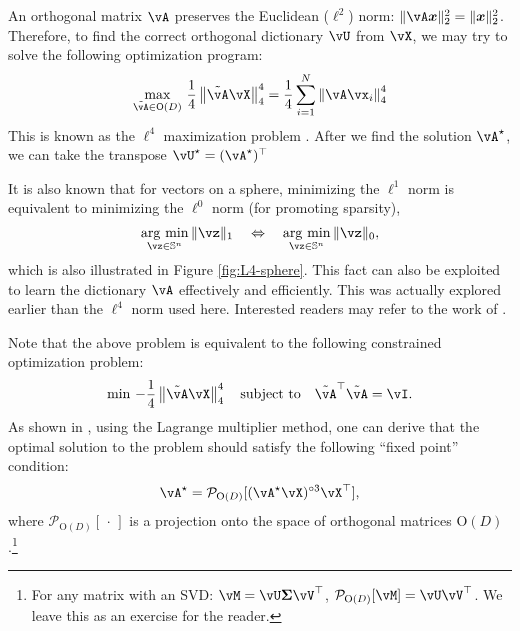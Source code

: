 \documentclass[../../book-main.tex]{subfiles}
\begin{document}
An orthogonal matrix $\vA$ preserves the Euclidean (\(\ell^{2}\)) norm: $\|\vA \x\|_2^2 = \|\x\|_2^2$. Therefore, to find the correct orthogonal dictionary $\vU$ from $\vX$, we may try to solve the following optimization program:
\begin{equation}\label{eq0:orthogonal-dictionary-learning-l4}
    \max_{\tilde{\vA} \in \O(D)}\,
     \frac{1}{4} \norm*{
    \tilde{\vA} \vX
    }_4^4 =  \frac{1}{4} \sum_{i=1}^N \norm*{
    \vA \vx_i
    }_4^4
\end{equation}
This is known as the $\ell^4$ maximization problem \cite{Zhai-2020}. After we
find the solution \(\vA^{\star}\), we can take the transpose \(\vU^{\star}
= (\vA^{\star})^{\top}\)
\begin{remark}
    It is also known that for vectors on a sphere, minimizing the $\ell^1$ norm is equivalent to minimizing the $\ell^0$ norm (for promoting sparsity),
\begin{equation*}
            \argmin_{\vz \in \mathbb{S}^n}\|\vz\|_{1}\quad\Leftrightarrow\quad \argmin_{\vz \in \mathbb{S}^n}\|\vz\|_{0},
\end{equation*}
which is also illustrated in Figure \ref{fig:L4-sphere}. This fact can also be exploited to learn the dictionary $\vA$ effectively and efficiently. This was actually explored earlier than the $\ell^4$ norm used here. Interested readers may refer to the work of \cite{qu2020findingsparsestvectorssubspace}.
\end{remark}

Note that the above problem is equivalent to the following constrained optimization problem:
\begin{equation}\label{eq:orthogonal-dictionary-learning-l4}
    \min\,
    -   \frac{1}{4} \norm*{
    \tilde{\vA} \vX
    }_4^4 \quad \mbox{subject to} \quad  \tilde{\vA}^\top\tilde{\vA} = \vI.
\end{equation}
As shown in \cite{Wright-Ma-2022}, using the Lagrange multiplier method, one can derive that the optimal solution to the problem should satisfy the following 
``fixed point'' condition:
\begin{equation}
    \vA^{\star} = \mathcal{P}_{\mathrm O(D)}[( {\vA^{\star} \vX})^{\circ3}\vX^\top],
\end{equation}
where $\mathcal{P}_{\mathrm O(D)}[\,\cdot\,]$ is a projection onto the space of orthogonal matrices $\mathrm O(D)$.\footnote{For any matrix with an SVD: $\vM = \vU\bm \Sigma \vV^\top$, $\mathcal{P}_{\mathrm O(D)}[\vM] = \vU \vV^\top$. We leave this as an exercise for the reader.} 
\end{document}
